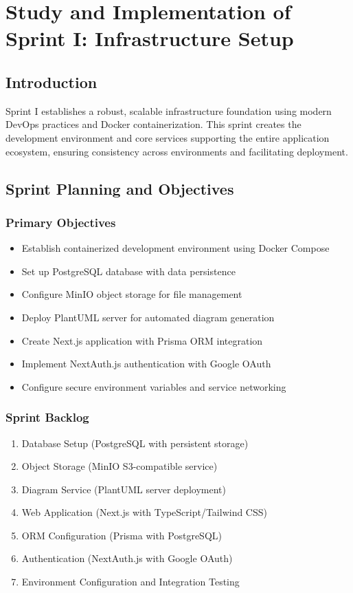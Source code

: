 \chapter[Sprint I]{Study and Implementation of Sprint I: Infrastructure Setup}

\section{Introduction}

Sprint I establishes a robust, scalable infrastructure foundation using modern DevOps practices and Docker containerization. This sprint creates the development environment and core services supporting the entire application ecosystem, ensuring consistency across environments and facilitating deployment.

\section{Sprint Planning and Objectives}

\subsection{Primary Objectives}
\begin{itemize}
    \item Establish containerized development environment using Docker Compose
    \item Set up PostgreSQL database with data persistence
    \item Configure MinIO object storage for file management
    \item Deploy PlantUML server for automated diagram generation
    \item Create Next.js application with Prisma ORM integration
    \item Implement NextAuth.js authentication with Google OAuth
    \item Configure secure environment variables and service networking
\end{itemize}

\subsection{Sprint Backlog}
\begin{enumerate}
    \item Database Setup (PostgreSQL with persistent storage)
    \item Object Storage (MinIO S3-compatible service)
    \item Diagram Service (PlantUML server deployment)
    \item Web Application (Next.js with TypeScript/Tailwind CSS)
    \item ORM Configuration (Prisma with PostgreSQL)
    \item Authentication (NextAuth.js with Google OAuth)
    \item Environment Configuration and Integration Testing
\end{enumerate}


